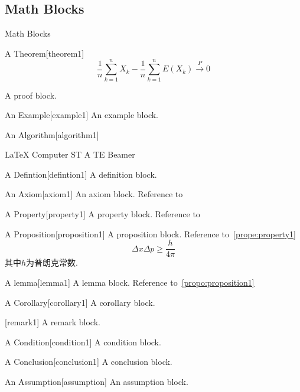 \documentclass[hyperref, UTF8, CJK]{beamer}
\begin{document}
\subsection{Math Blocks}
\begin{frame}{Math Blocks}
	\begin{scutheorem}{A Theorem}[theorem1]
		\begin{equation}
		\dfrac{1}{n} \sum_{k=1}^{n} X_k - \dfrac{1}{n} \sum_{k=1}^{n} E(X_k) \stackrel{\;P\;}{\longrightarrow} 0
		\end{equation}
	\end{scutheorem}
	\begin{scuproof}{}
		A proof block.
	\end{scuproof}
	\begin{scuexample}{An Example}[example1]
		An example block.
	\end{scuexample}
	\begin{scualgorithm}{An Algorithm}[algorithm1]
		\begin{algorithmic}[1]
			\REQUIRE \LaTeX{}
			\ENSURE Computer
			\STATE ST
			\STATE A
			\STATE TE
			\RETURN Beamer
		\end{algorithmic}
	\end{scualgorithm}
	\begin{scudefinition}{A Defintion}[defintion1]
		A definition block.
	\end{scudefinition}
	\begin{scuaxiom}{An Axiom}[axiom1]
		An axiom block. Reference to~
	\end{scuaxiom}
	\begin{scuproperty}{A Property}[property1]
		A property block. Reference to~
	\end{scuproperty}
	\begin{scuproposition}{A Proposition}[proposition1]
		A proposition block. Reference to~\vref{prope:property1}
		\begin{equation}
		\Delta x \Delta p \geq \dfrac{h}{4\pi}
		\end{equation}
		其中$h$为普朗克常数.
	\end{scuproposition}
	\begin{sculemma}{A lemma}[lemma1]
		A lemma block. Reference to~\cref{propo:proposition1}
	\end{sculemma}
	\begin{scucorollary}{A Corollary}[corollary1]
		A corollary block.
	\end{scucorollary}
	\begin{scuremark}{}[remark1]
		A remark block.
	\end{scuremark}
	\begin{scucondition}{A Condition}[condition1]
		A condition block.
	\end{scucondition}
	\begin{scuconclusion}{A Conclusion}[conclusion1]
		A conclusion block.
	\end{scuconclusion}
	\begin{scuassumption}{An Assumption}[assumption]
		An assumption block.
	\end{scuassumption}
\end{frame}
\end{document}
